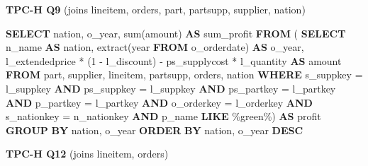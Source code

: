 \documentclass[
  10pt,
]{article}
\newenvironment{Shaded}{}{}
\newcommand{\DataTypeTok}[1]{\textcolor[rgb]{0.56,0.13,0.00}{#1}}
\newcommand{\DecValTok}[1]{\textcolor[rgb]{0.25,0.63,0.44}{#1}}
\newcommand{\FunctionTok}[1]{\textcolor[rgb]{0.02,0.16,0.49}{#1}}
\newcommand{\KeywordTok}[1]{\textcolor[rgb]{0.00,0.44,0.13}{\textbf{#1}}}
\newcommand{\NormalTok}[1]{#1}
\newcommand{\OperatorTok}[1]{\textcolor[rgb]{0.40,0.40,0.40}{#1}}
\newcommand{\StringTok}[1]{\textcolor[rgb]{0.25,0.44,0.63}{#1}}
\begin{document}
\textbf{TPC-H Q9} (joins lineitem, orders, part, partsupp, supplier,
nation)

\begin{Shaded}
\begin{Highlighting}[]
\KeywordTok{SELECT}
\NormalTok{    nation,}
\NormalTok{    o\_year,}
    \FunctionTok{sum}\NormalTok{(amount) }\KeywordTok{AS}\NormalTok{ sum\_profit}
\KeywordTok{FROM}\NormalTok{ (}
    \KeywordTok{SELECT}
\NormalTok{        n\_name }\KeywordTok{AS}\NormalTok{ nation,}
        \FunctionTok{extract}\NormalTok{(}\DataTypeTok{year} \KeywordTok{FROM}\NormalTok{ o\_orderdate) }\KeywordTok{AS}\NormalTok{ o\_year,}
\NormalTok{        l\_extendedprice }\OperatorTok{*}\NormalTok{ (}\DecValTok{1} \OperatorTok{{-}}\NormalTok{ l\_discount) }\OperatorTok{{-}}\NormalTok{ ps\_supplycost }\OperatorTok{*}\NormalTok{ l\_quantity }\KeywordTok{AS}\NormalTok{ amount}
    \KeywordTok{FROM}
\NormalTok{        part,}
\NormalTok{        supplier,}
\NormalTok{        lineitem,}
\NormalTok{        partsupp,}
\NormalTok{        orders,}
\NormalTok{        nation}
    \KeywordTok{WHERE}
\NormalTok{        s\_suppkey }\OperatorTok{=}\NormalTok{ l\_suppkey}
        \KeywordTok{AND}\NormalTok{ ps\_suppkey }\OperatorTok{=}\NormalTok{ l\_suppkey}
        \KeywordTok{AND}\NormalTok{ ps\_partkey }\OperatorTok{=}\NormalTok{ l\_partkey}
        \KeywordTok{AND}\NormalTok{ p\_partkey }\OperatorTok{=}\NormalTok{ l\_partkey}
        \KeywordTok{AND}\NormalTok{ o\_orderkey }\OperatorTok{=}\NormalTok{ l\_orderkey}
        \KeywordTok{AND}\NormalTok{ s\_nationkey }\OperatorTok{=}\NormalTok{ n\_nationkey}
        \KeywordTok{AND}\NormalTok{ p\_name }\KeywordTok{LIKE} \StringTok{\textquotesingle{}\%green\%\textquotesingle{}}\NormalTok{) }\KeywordTok{AS}\NormalTok{ profit}
\KeywordTok{GROUP} \KeywordTok{BY}
\NormalTok{    nation,}
\NormalTok{    o\_year}
\KeywordTok{ORDER} \KeywordTok{BY}
\NormalTok{    nation,}
\NormalTok{    o\_year }\KeywordTok{DESC}
\end{Highlighting}
\end{Shaded}

\textbf{TPC-H Q12} (joins lineitem, orders)
\end{document}

